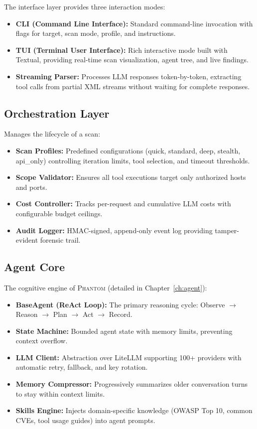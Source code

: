 \documentclass[12pt,a4paper,twoside]{report}
\makeatletter
\newcommand{\phantom@}{\textsc{Phantom}}
\makeatother
\begin{document}
The interface layer provides three interaction modes:

\begin{itemize}
    \item \textbf{CLI (Command Line Interface):} Standard command-line invocation with flags for target, scan mode, profile, and instructions.
    \item \textbf{TUI (Terminal User Interface):} Rich interactive mode built with Textual, providing real-time scan visualization, agent tree, and live findings.
    \item \textbf{Streaming Parser:} Processes LLM responses token-by-token, extracting tool calls from partial XML streams without waiting for complete responses.
\end{itemize}

\subsection{Orchestration Layer}

Manages the lifecycle of a scan:

\begin{itemize}
    \item \textbf{Scan Profiles:} Predefined configurations (quick, standard, deep, stealth, api\_only) controlling iteration limits, tool selection, and timeout thresholds.
    \item \textbf{Scope Validator:} Ensures all tool executions target only authorized hosts and ports.
    \item \textbf{Cost Controller:} Tracks per-request and cumulative LLM costs with configurable budget ceilings.
    \item \textbf{Audit Logger:} HMAC-signed, append-only event log providing tamper-evident forensic trail.
\end{itemize}

\subsection{Agent Core}

The cognitive engine of \phantom@{} (detailed in Chapter~\ref{ch:agent}):

\begin{itemize}
    \item \textbf{BaseAgent (ReAct Loop):} The primary reasoning cycle: Observe $\rightarrow$ Reason $\rightarrow$ Plan $\rightarrow$ Act $\rightarrow$ Record.
    \item \textbf{State Machine:} Bounded agent state with memory limits, preventing context overflow.
    \item \textbf{LLM Client:} Abstraction over LiteLLM supporting 100+ providers with automatic retry, fallback, and key rotation.
    \item \textbf{Memory Compressor:} Progressively summarizes older conversation turns to stay within context limits.
    \item \textbf{Skills Engine:} Injects domain-specific knowledge (OWASP Top 10, common CVEs, tool usage guides) into agent prompts.
\end{itemize}
\end{document}
